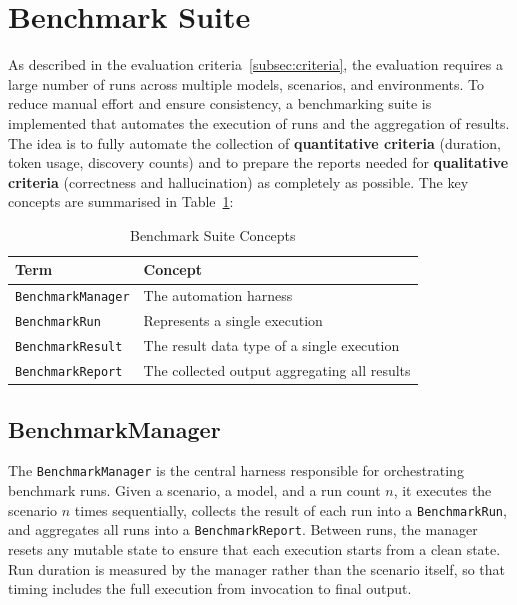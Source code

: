 \section{Benchmark Suite}\label{sec:benchmark-suite}

As described in the evaluation criteria~\ref{subsec:criteria},
the evaluation requires a large number of runs across multiple models, scenarios, and environments.
To reduce manual effort and ensure consistency,
a benchmarking suite is implemented that automates the execution of runs and the aggregation of results.
The idea is to fully automate the collection of \textbf{quantitative criteria} (duration, token usage, discovery counts)
and to prepare the reports needed for \textbf{qualitative criteria} (correctness and hallucination) as completely as possible.
The key concepts are summarised in Table~\ref{tab:benchmark-suite-concepts}:

\begin{table}[h]
    \centering
    \begin{tabular}{ll}
        \hline
        \textbf{Term} & \textbf{Concept} \\
        \hline
        \texttt{BenchmarkManager} & The automation harness \\
        \texttt{BenchmarkRun} & Represents a single execution \\
        \texttt{BenchmarkResult} & The result data type of a single execution \\
        \texttt{BenchmarkReport} & The collected output aggregating all results \\
        \hline
    \end{tabular}
    \caption{Benchmark Suite Concepts}
    \label{tab:benchmark-suite-concepts}
\end{table}

\subsection{BenchmarkManager}\label{subsec:benchmark-manager}

The \texttt{BenchmarkManager} is the central harness responsible for orchestrating benchmark runs.
Given a scenario, a model, and a run count $n$, it executes the scenario $n$ times sequentially,
collects the result of each run into a \texttt{BenchmarkRun},
and aggregates all runs into a \texttt{BenchmarkReport}.
Between runs, the manager resets any mutable state to ensure that each execution starts from a clean state.
Run duration is measured by the manager rather than the scenario itself,
so that timing includes the full execution from invocation to final output.

